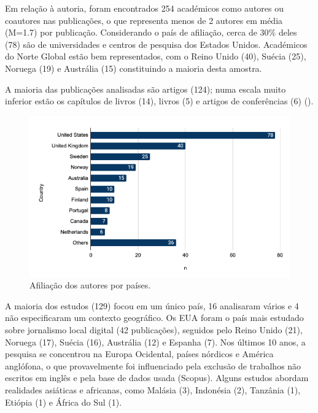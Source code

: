 \documentclass[portuguese]{textolivre}
\begin{document}
Em relação à autoria, foram encontrados 254 académicos como autores ou coautores nas publicações, o que representa menos de 2 autores em média (M=1.7) por publicação. Considerando o país de afiliação, cerca de 30\% deles (78) são de universidades e centros de pesquisa dos Estados Unidos. Académicos do Norte Global estão bem representados, com o Reino Unido (40), Suécia (25), Noruega (19) e Austrália (15) constituindo a maioria desta amostra.

A maioria das publicações analisadas são artigos (124); numa escala muito inferior estão os capítulos de livros (14), livros (5) e artigos de conferências (6) ().


\begin{figure}[htbp]
\centering
\begin{minipage}{0.85\textwidth}
\includegraphics[width =\textwidth]{Imagens/Fig3.png}
\caption{Afiliação dos autores por países.}
\label{fig-3}
\end{minipage}
\end{figure}

A maioria dos estudos (129) focou em um único país, 16 analisaram vários e 4 não especificaram um contexto geográfico. Os EUA foram o país mais estudado sobre jornalismo local digital (42 publicações), seguidos pelo Reino Unido (21), Noruega (17), Suécia (16), Austrália (12) e Espanha (7). Nos últimos 10 anos, a pesquisa se concentrou na Europa Ocidental, países nórdicos e América anglófona, o que provavelmente foi influenciado pela exclusão de trabalhos não escritos em inglês e pela base de dados usada (Scopus). Alguns estudos abordam realidades asiáticas e africanas, como Malásia (3), Indonésia (2), Tanzânia (1), Etiópia (1) e África do Sul (1).
\end{document}
